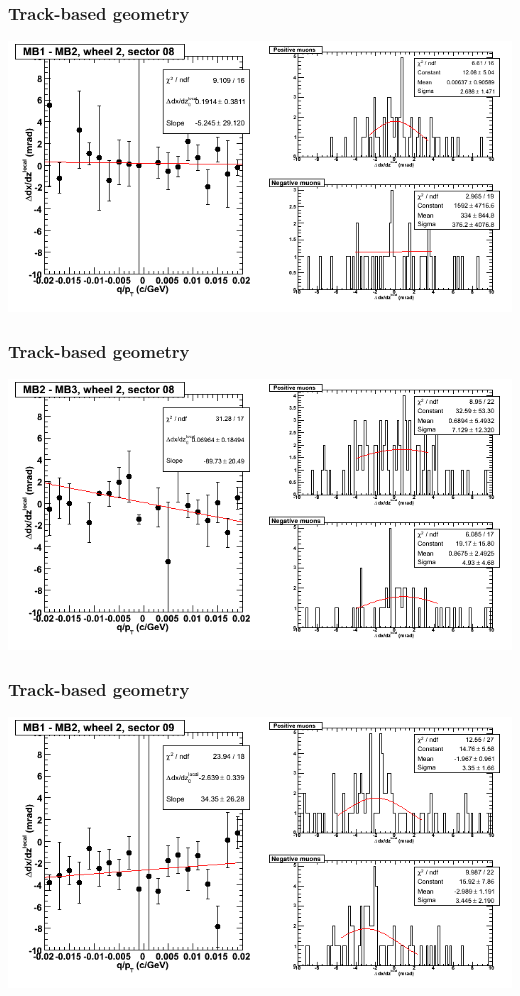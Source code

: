 \documentclass[compress]{beamer}
\begin{document}
\begin{frame}
\frametitle{Track-based geometry}
\includegraphics[width=\linewidth]{NOV4_segdiffs/dt13_slope_E_08_12.png}
\end{frame}

\begin{frame}
\frametitle{Track-based geometry}
\includegraphics[width=\linewidth]{NOV4_segdiffs/dt13_slope_E_08_23.png}
\end{frame}

\begin{frame}
\frametitle{Track-based geometry}
\includegraphics[width=\linewidth]{NOV4_segdiffs/dt13_slope_E_09_12.png}
\end{frame}
\end{document}

